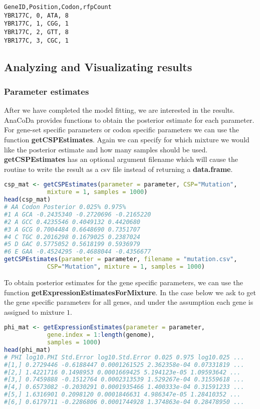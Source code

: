 \begin{verbatim}
GeneID,Position,Codon,rfpCount
YBR177C, 0, ATA, 8
YBR177C, 1, CGG, 1
YBR177C, 2, GTT, 8
YBR177C, 3, CGC, 1
\end{verbatim}

\subsection{Analyzing and Visualizating results}

\subsubsection{Parameter estimates}

After we have completed the model fitting, we are interested in the results. 
AnaCoDa provides functions to obtain the posterior estimate for each parameter. 
For gene-set specific parameters or codon specific parameters we can use the function \textbf{getCSPEstimates}. 
Again we can specify for which mixture we would like the posterior estimate and how many samples should be used. 
\textbf{getCSPEstimates} has an optional argument filename which will cause the routine to write the result as a csv file instead of returning a \textbf{data.frame}.

\begin{lstlisting}[language=R]
csp_mat <- getCSPEstimates(parameter = parameter, CSP="Mutation", 
			mixture = 1, samples = 1000)
head(csp_mat)
# AA Codon Posterior 0.025% 0.975%
#1 A GCA -0.2435340 -0.2720696 -0.2165220
#2 A GCC 0.4235546 0.4049132 0.4420680
#3 A GCG 0.7004484 0.6648690 0.7351707
#4 C TGC 0.2016298 0.1679025 0.2387024
#5 D GAC 0.5775052 0.5618199 0.5936979
#6 E GAA -0.4524295 -0.4688044 -0.4356677
getCSPEstimates(parameter = parameter, filename = "mutation.csv",
			CSP="Mutation", mixture = 1, samples = 1000)
\end{lstlisting}

To obtain posterior estimates for the gene specific parameters, we can use the function \textbf{getExpressionEstimatesForMixture}.
In the case below we ask to get the gene specific parameters for all genes, and under the assumption each gene is assigned to mixture $1$.

\begin{lstlisting}[language=R]
phi_mat <- getExpressionEstimates(parameter = parameter,
			gene.index = 1:length(genome),
			samples = 1000)
head(phi_mat)
# PHI log10.PHI Std.Error log10.Std.Error 0.025 0.975 log10.025 ...
#[1,] 0.2729446 -0.6188447 0.0001261525 2.362358e-04 0.07331819 ...
#[2,] 1.4221716 0.1498953 0.0001669425 5.194123e-05 1.09593642 ...
#[3,] 0.7459888 -0.1512764 0.0002313539 1.529267e-04 0.31559618 ...
#[4,] 0.6573082 -0.2030291 0.0001935466 1.400333e-04 0.31591233 ...
#[5,] 1.6316901 0.2098120 0.0001846631 4.986347e-05 1.28410352 ...
#[6,] 0.6179711 -0.2286806 0.0001744928 1.374863e-04 0.28478950 ...
\end{lstlisting}

